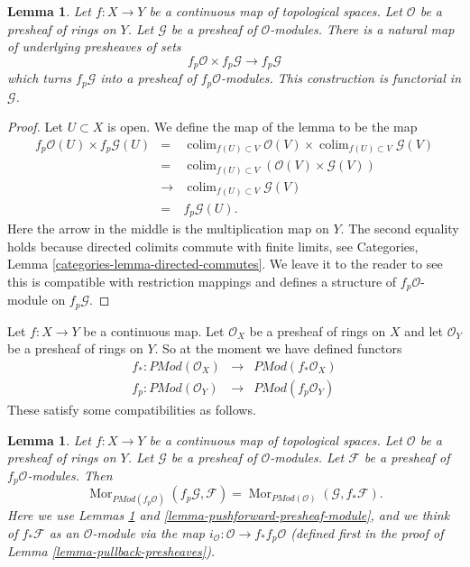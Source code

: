 \documentclass{stacks-project}
\theoremstyle{plain}
\newtheorem{lemma}[subsection]{Lemma}
\theoremstyle{definition}
\theoremstyle{remark}
\numberwithin{equation}{subsection}
\def\colim{\mathop{\mathrm{colim}}\nolimits}
\def\Mor{\mathop{\mathrm{Mor}}\nolimits}
\begin{document}
\begin{lemma}
\label{lemma-pullback-presheaf-module}
Let $f : X \to Y$ be a continuous map of topological spaces.
Let $\mathcal{O}$ be a presheaf of rings on $Y$. Let
$\mathcal{G}$ be a presheaf of $\mathcal{O}$-modules.
There is a natural map of underlying presheaves of sets
$$
f_p\mathcal{O} \times f_p\mathcal{G}
\longrightarrow
f_p\mathcal{G}
$$
which turns $f_p\mathcal{G}$ into a presheaf of $f_p\mathcal{O}$-modules.
This construction is functorial in $\mathcal{G}$.
\end{lemma}

\begin{proof}
Let $U \subset X$ is open. We define the map of the lemma
to be the map
\begin{eqnarray*}
f_p\mathcal{O}(U) \times f_p\mathcal{G}(U)
& = &
\colim_{f(U) \subset V} \mathcal{O}(V)
\times
\colim_{f(U) \subset V} \mathcal{G}(V) \\
& = &
\colim_{f(U) \subset V} (\mathcal{O}(V)\times \mathcal{G}(V)) \\
& \to &
\colim_{f(U) \subset V} \mathcal{G}(V) \\
& = &
f_p\mathcal{G}(U).
\end{eqnarray*}
Here the arrow in the middle is the multiplication map on $Y$.
The second equality holds because directed colimits commute
with finite limits, see
Categories, Lemma \ref{categories-lemma-directed-commutes}.
We leave it to the reader to see this is compatible with
restriction mappings and defines a structure of
$f_p\mathcal{O}$-module on $f_p\mathcal{G}$.
\end{proof}

\noindent
Let $f : X \to Y$ be a continuous map.
Let $\mathcal{O}_X$ be a presheaf of rings on $X$ and
let $\mathcal{O}_Y$ be a presheaf of rings on $Y$.
So at the moment we have defined functors
\begin{eqnarray*}
f_* : \textit{PMod}(\mathcal{O}_X) &
\longrightarrow &
\textit{PMod}(f_*\mathcal{O}_X) \\
f_p : \textit{PMod}(\mathcal{O}_Y) &
\longrightarrow &
\textit{PMod}(f_p\mathcal{O}_Y)
\end{eqnarray*}
These satisfy some compatibilities as follows.

\begin{lemma}
\label{lemma-adjoint-push-pull-presheaves-modules}
Let $f : X \to Y$ be a continuous map of topological spaces.
Let $\mathcal{O}$ be a presheaf of rings on $Y$.
Let $\mathcal{G}$ be a presheaf of $\mathcal{O}$-modules.
Let $\mathcal{F}$ be a presheaf of $f_p\mathcal{O}$-modules.
Then
$$
\Mor_{\textit{PMod}(f_p\mathcal{O})}(f_p\mathcal{G}, \mathcal{F})
=
\Mor_{\textit{PMod}(\mathcal{O})}(\mathcal{G}, f_*\mathcal{F}).
$$
Here we use
Lemmas \ref{lemma-pullback-presheaf-module}
and \ref{lemma-pushforward-presheaf-module}, and we think of
$f_*\mathcal{F}$ as an $\mathcal{O}$-module via the map
$i_\mathcal{O} : \mathcal{O} \to f_*f_p\mathcal{O}$
(defined first in the proof of Lemma \ref{lemma-pullback-presheaves}).
\end{lemma}
\end{document}
